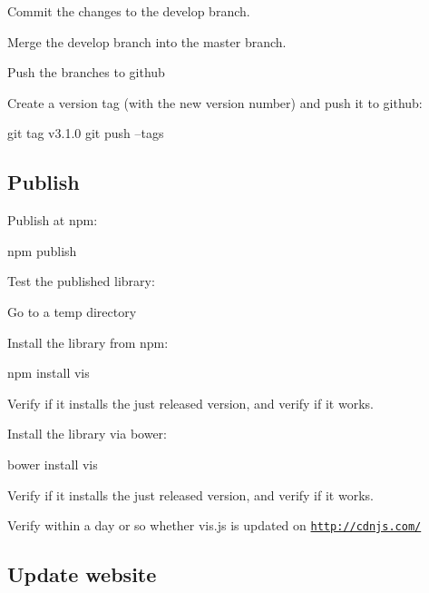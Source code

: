 \begin{DoxyItemize}
\item Commit the changes to the {\ttfamily develop} branch.
\item Merge the {\ttfamily develop} branch into the {\ttfamily master} branch.
\item Push the branches to github
\item Create a version tag (with the new version number) and push it to github\+: \begin{DoxyVerb}  git tag v3.1.0
  git push --tags
\end{DoxyVerb}

\end{DoxyItemize}

\subsection*{Publish}


\begin{DoxyItemize}
\item Publish at npm\+: \begin{DoxyVerb}  npm publish
\end{DoxyVerb}

\item Test the published library\+:
\begin{DoxyItemize}
\item Go to a temp directory
\item Install the library from npm\+: \begin{DoxyVerb}  npm install vis
\end{DoxyVerb}


Verify if it installs the just released version, and verify if it works.
\item Install the library via bower\+: \begin{DoxyVerb}  bower install vis
\end{DoxyVerb}


Verify if it installs the just released version, and verify if it works.
\item Verify within a day or so whether vis.\+js is updated on \href{http://cdnjs.com/}{\tt http\+://cdnjs.\+com/}
\end{DoxyItemize}
\end{DoxyItemize}

\subsection*{Update website}


